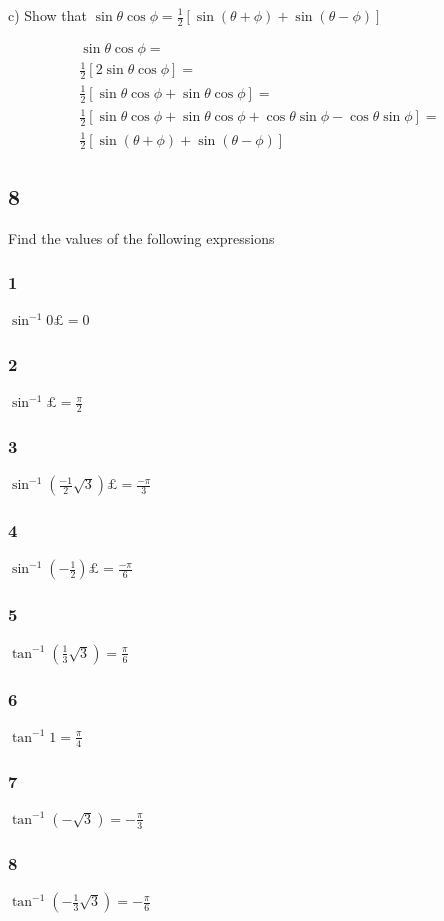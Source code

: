 \documentclass[]{report}
\begin{document}
c) Show that $\sin\theta\cos\phi = \frac{1}{2}[\sin(\theta + \phi) + \sin(\theta - \phi)]$

\begin{align*}
\sin\theta\cos\phi = \\
\frac{1}{2}[2\sin\theta\cos\phi] = \\
\frac{1}{2}[\sin\theta\cos\phi + \sin\theta\cos\phi] = \\
\frac{1}{2}[\sin\theta\cos\phi + \sin\theta\cos\phi + \cos\theta\sin\phi - \cos\theta\sin\phi] = \\
\frac{1}{2}[\sin(\theta + \phi) + \sin(\theta - \phi)]
\end{align*}

\subsection{8}
Find the values of the following expressions

\subsubsection{1}
$\sin^{-1}0£ = 0$
\subsubsection{2}
$\sin^{-1}£ = \frac{\pi}{2}$
\subsubsection{3}
$\sin^{-1}(\frac{-1}{2}\sqrt{3})£ = \frac{-\pi}{3}$
\subsubsection{4}
$\sin^{-1}(-\frac{1}{2})£ = \frac{-\pi}{6}$
\subsubsection{5}
$\tan^{-1}(\frac{1}{3}\sqrt{3}) =\frac{\pi}{6} $
\subsubsection{6}
$\tan^{-1}1 = \frac{\pi}{4}$
\subsubsection{7}
$\tan^{-1}(-\sqrt{3}) = -\frac{\pi}{3}$
\subsubsection{8}
$\tan^{-1}(-\frac{1}{3}\sqrt{3}) = -\frac{\pi}{6}$
\end{document}
